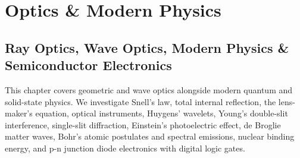 \documentclass[10pt,twoside,openright]{book}
\begin{document}
\part{Optics \& Modern Physics}

\chapter{Ray Optics, Wave Optics, Modern Physics \& Semiconductor Electronics}

This chapter covers geometric and wave optics alongside modern quantum and solid-state physics. We investigate Snell's law, total internal reflection, the lens-maker's equation, optical instruments, Huygens' wavelets, Young's double-slit interference, single-slit diffraction, Einstein's photoelectric effect, de Broglie matter waves, Bohr's atomic postulates and spectral emissions, nuclear binding energy, and p-n junction diode electronics with digital logic gates.
\end{document}
